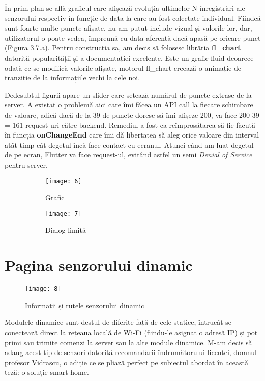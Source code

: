 În prim plan se află graficul care afișează evoluția ultimelor N înregistrări ale senzorului respectiv în funcție de data la care au fost colectate individual. Fiindcă sunt foarte multe puncte afișate, nu am putut include vizual și valorile lor, dar, utilizatorul o poate vedea, împreună cu data aferentă dacă apasă pe oricare punct (Figura 3.7.a). Pentru construcția sa, am decis să folosesc librăria \textbf{fl\_chart} datorită popularității și a documentației excelente. Este un grafic fluid deoarece odată ce se modifică valorile afișate, motorul fl\_chart creează o animație de tranziție de la informațiile vechi la cele noi.

Dedesubtul figurii apare un slider care setează numărul de puncte extrase de la server. A existat o problemă aici care îmi făcea un API call la fiecare schimbare de valoare, adică dacă de la 39 de puncte doresc să îmi afișeze 200, va face 200-39 = 161 request-uri către backend. Remediul a fost ca reîmprosătarea să fie făcută în funcția \textbf{onChangeEnd} care îmi dă libertatea să aleg orice valoare din interval atât timp cât degetul încă face contact cu ecranul. Atunci când am luat degetul de pe ecran, Flutter va face request-ul, evitând astfel un semi \emph{Denial of Service} pentru server.

\begin{figure}[h]
	\centering
	\begin{subfigure}{0.45\textwidth}
		\texttt{[image: 6]}
		\caption{Grafic}
		\label{fig:6}
	\end{subfigure}
	\hfill
	\begin{subfigure}{0.45\textwidth}
		\texttt{[image: 7]}
		\caption{Dialog limită}
		\label{fig:7}
	\end{subfigure}
	\caption{}
	\label{fig:all3}
\end{figure}

\section{Pagina senzorului dinamic}

\begin{wrapfigure}{r}{0.3\textwidth}
	\texttt{[image: 8]}
	\caption{Informații și rutele senzorului dinamic}
	\label{fig:8}
\end{wrapfigure}

Modulele dinamice sunt destul de diferite față de cele statice, întrucât se conectează direct la rețeaua locală de Wi-Fi (fiindu-le asignat o adresă IP) și pot primi sau trimite comenzi la server sau la alte module dinamice. M-am decis să adaug acest tip de senzori datorită recomandării îndrumătorului licenței, domnul profesor Vidrașcu, o adiție ce se pliază perfect pe subiectul abordat în această teză: o soluție smart home.

